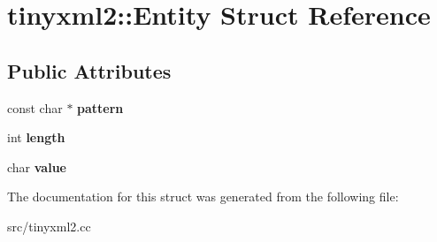 \hypertarget{structtinyxml2_1_1Entity}{}\section{tinyxml2\+:\+:Entity Struct Reference}
\label{structtinyxml2_1_1Entity}
\subsection*{Public Attributes}
\begin{DoxyCompactItemize}
\item 
const char $\ast$ {\bfseries pattern}\hypertarget{structtinyxml2_1_1Entity_ab330f5d665d29bfc811ecfa76315894b}{}\label{structtinyxml2_1_1Entity_ab330f5d665d29bfc811ecfa76315894b}

\item 
int {\bfseries length}\hypertarget{structtinyxml2_1_1Entity_a25e2b57cb59cb4fa68f283d7cb570f21}{}\label{structtinyxml2_1_1Entity_a25e2b57cb59cb4fa68f283d7cb570f21}

\item 
char {\bfseries value}\hypertarget{structtinyxml2_1_1Entity_a7334e81e33b4615655a403711b24f3ed}{}\label{structtinyxml2_1_1Entity_a7334e81e33b4615655a403711b24f3ed}

\end{DoxyCompactItemize}


The documentation for this struct was generated from the following file\+:\begin{DoxyCompactItemize}
\item 
src/tinyxml2.\+cc\end{DoxyCompactItemize}
